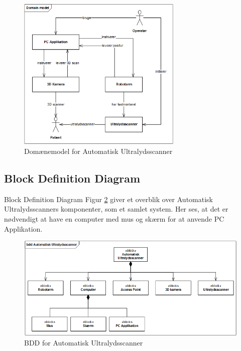 \begin{figure}[H]
    \centering
    \includegraphics[width=0.7\textwidth]{figurer/d/Design/uml_domain}
    \caption{Domænemodel for Automatisk Ultralydsscanner}
    \label{domain}
\end{figure}

\subsection{Block Definition Diagram}
Block Definition Diagram Figur \ref{BDD} giver et overblik over Automatisk Ultralydsscanners komponenter, som et samlet system.
Her ses, at det er nødvendigt at have en computer med mus og skærm for at anvende PC Applikation.

\begin{figure}[H]
    \centering
    \includegraphics[width=1\textwidth]{figurer/d/Design/BDD}
    \caption{BDD for Automatisk Ultralydsscanner}
    \label{BDD}
\end{figure}
\newpage

